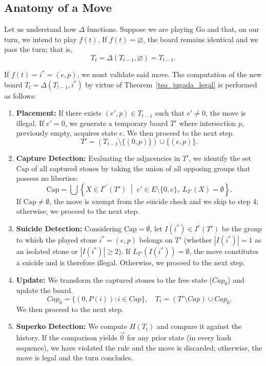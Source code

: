 \subsection{Anatomy of a Move}

Let us understand how $\Delta$ functions. Suppose we are playing Go and that, on our turn, we intend to play $f(t)$.
If $f(t) = \varnothing$, the board remains identical and we pass the turn; that is,
$$T_{t} = \Delta(T_{t-1}, \varnothing) = T_{t-1}.$$

If $f(t) = i^{*} = (e, p)$, we must validate said move. The computation of the new board $T_t = \Delta(T_{t-1}, i^{*})$ by virtue of Theorem~\ref{teo_jugada_legal} is performed as follows:
\begin{enumerate}
	\item \textbf{Placement:} If there exists $(e',p)\in T_{t-1}$ such that $e' \neq 0$, the move is illegal. If $e'=0$, we generate a temporary board $T'$ where intersection $p$, previously empty, acquires state $e$. We then proceed to the next step.
	$$T' = \left(T_{t-1} \setminus \{(0, p)\}\right) \cup \{(e, p)\}.$$
	
	\item \textbf{Capture Detection:} Evaluating the adjacencies in $T'$, we identify the set $\mathrm{Cap}$ of all captured stones by taking the union of all opposing groups that possess no liberties:
	\[
	\mathrm{Cap} = \bigcup \left\{ X \in I^{e'}(T') \;\middle|\; e' \in E \setminus \{0, e\}, \; L_{T'}(X) = \emptyset \right\}.
	\]
	If $\mathrm{Cap} \neq \emptyset$, the move is exempt from the suicide check and we skip to step 4; otherwise, we proceed to the next step.
	
	\item \textbf{Suicide Detection:} Considering $\mathrm{Cap} = \emptyset$, let $I(i^*) \in I^e(T')$ be the group to which the played stone $i^* = (e, p)$ belongs on $T'$ (whether $|I(i^*)| = 1$ as an isolated stone or $|I(i^*)| \ge 2$). If $L_{T'}(I(i^*)) = \emptyset$, the move constitutes a suicide and is therefore illegal. Otherwise, we proceed to the next step.
	
	\item \textbf{Update:} We transform the captured stones to the free state ($Cap_0$) and update the board.$$Cap_0 = \{(0, P(i)) : i \in Cap\},\quad T_t = (T' \setminus Cap) \cup Cap_0.$$
	We then proceed to the next step.
	
	\item \textbf{Superko Detection:}
	We compute $H(T_t)$ and compare it against the history. If the comparison yields $\vec{0}$ for any prior state (in every hash sequence), we have violated the rule and the move is discarded; otherwise, the move is legal and the turn concludes.
	\end{enumerate}
	
